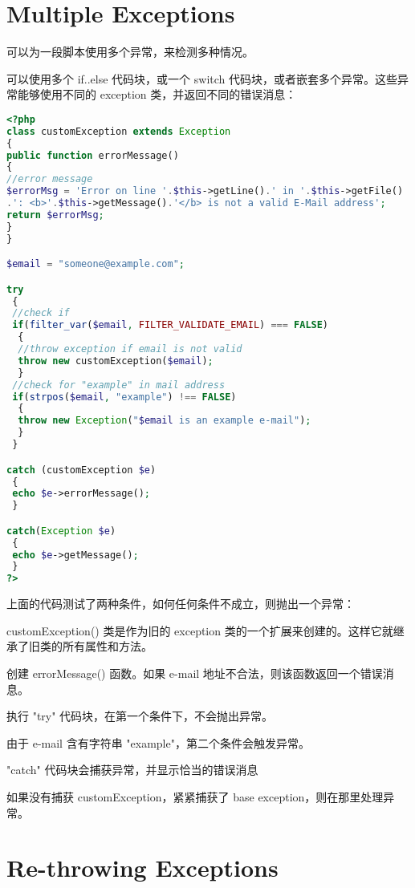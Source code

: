 \section{Multiple Exceptions}

可以为一段脚本使用多个异常，来检测多种情况。


可以使用多个 if..else 代码块，或一个 switch 代码块，或者嵌套多个异常。这些异常能够使用不同的 exception 类，并返回不同的错误消息：

\begin{lstlisting}[language=PHP]
<?php
class customException extends Exception
{
public function errorMessage()
{
//error message
$errorMsg = 'Error on line '.$this->getLine().' in '.$this->getFile()
.': <b>'.$this->getMessage().'</b> is not a valid E-Mail address';
return $errorMsg;
}
}

$email = "someone@example.com";

try
 {
 //check if 
 if(filter_var($email, FILTER_VALIDATE_EMAIL) === FALSE)
  {
  //throw exception if email is not valid
  throw new customException($email);
  }
 //check for "example" in mail address
 if(strpos($email, "example") !== FALSE)
  {
  throw new Exception("$email is an example e-mail");
  }
 }

catch (customException $e)
 {
 echo $e->errorMessage();
 }

catch(Exception $e)
 {
 echo $e->getMessage();
 }
?>
\end{lstlisting}

上面的代码测试了两种条件，如何任何条件不成立，则抛出一个异常：

\begin{compactenum}
\item customException() 类是作为旧的 exception 类的一个扩展来创建的。这样它就继承了旧类的所有属性和方法。
\item 创建 errorMessage() 函数。如果 e-mail 地址不合法，则该函数返回一个错误消息。
\item 执行 "try" 代码块，在第一个条件下，不会抛出异常。
\item 由于 e-mail 含有字符串 "example"，第二个条件会触发异常。
\item "catch" 代码块会捕获异常，并显示恰当的错误消息
\end{compactenum}


如果没有捕获 customException，紧紧捕获了 base exception，则在那里处理异常。




\section{Re-throwing Exceptions}

